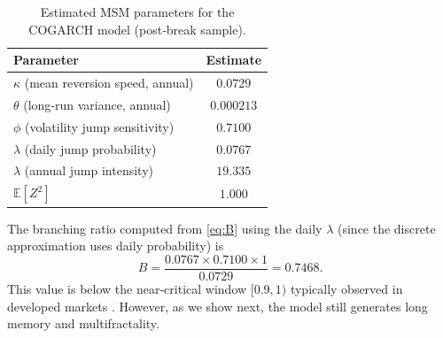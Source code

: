 \begin{table}[H]
\centering
\caption{Estimated MSM parameters for the COGARCH model (post‑break sample).}
\label{tab:params}
\begin{tabular}{l c}
\toprule
\textbf{Parameter} & \textbf{Estimate} \\
\midrule
$\kappa$ (mean reversion speed, annual) & $0.0729$ \\
$\theta$ (long‑run variance, annual) & $0.000213$ \\
$\phi$ (volatility jump sensitivity) & $0.7100$ \\
$\lambda$ (daily jump probability) & $0.0767$ \\
$\lambda$ (annual jump intensity) & $19.335$ \\
$\mathbb{E}[Z^2]$ & $1.000$ \\
\bottomrule
\end{tabular}
\end{table}

The branching ratio computed from \eqref{eq:B} using the daily $\lambda$ (since the discrete approximation uses daily probability) is
\[
B = \frac{0.0767 \times 0.7100 \times 1}{0.0729} = 0.7468.
\]
This value is below the near‑critical window $[0.9,1)$ typically observed in developed markets \cite{hardiman2013critical}. However, as we show next, the model still generates long memory and multifractality.


